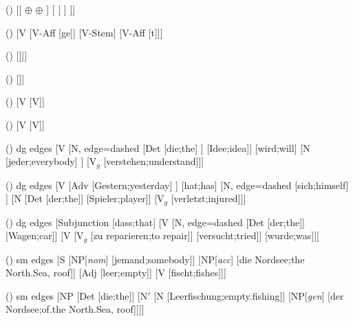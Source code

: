 \begin {forest}()
 [{[ \phon {} $\oplus $  $\oplus $  ]} [ {[ \phon {} ]} ]] \end {forest}
\begin {forest}()
 [V [V-Aff [ge]] [V-Stem] [V-Aff [t]]] \end {forest}
\begin {forest}()
 [\vP [DP] [\littlevbar [\textit {v}{[\st {\textit {u}D}]}] [VP [\textit {kill} {[V, \st {\textit {u}D}]}] [DP ]]]] \end {forest}
\begin {forest}()
 [\vP [\textit {v}] [VP [\textit {kill} {[V, \st {\textit {u}D}]}] [DP ]]] \end {forest}
\begin {forest}()
 [V [V]] \end {forest}
\begin {forest}()
 [V [V]] \end {forest}
\begin {forest}()
 dg edges [V [N, edge=dashed [Det [die;the] ] [Idee;idea]] [wird;will] [N [jeder;everybody] ] [V$_g$ [verstehen;understand]]] \end {forest}
\begin {forest}()
 dg edges [V [Adv [Gestern;yesterday] ] [hat;has] [N, edge=dashed [sich;himself] ] [N [Det [der;the]] [Spieler;player]] [V$_g$ [verletzt;injured]]] \end {forest}
\begin {forest}()
 dg edges [Subjunction [dass;that] [V [N, edge=dashed [Det [der;the]] [Wagen;car]] [V [V$_g$ [zu reparieren;to repair]] [versucht;tried]] [wurde;was]]] \end {forest}
\begin {forest}()
 sm edges [S [NP{[\textit {nom}]} [jemand;somebody]] [NP{[\textit {acc}]} [die Nordsee;the North.Sea, roof]] [Adj [leer;empty]] [V [fischt;fishes]]] \end {forest}
\begin {forest}()
 sm edges [NP [Det [die;the]] [N$'$ [N [Leerfischung;empty.fishing]] [NP{[\textit {gen}]} [der Nordsee;of.the North.Sea, roof]]]] \end {forest}
